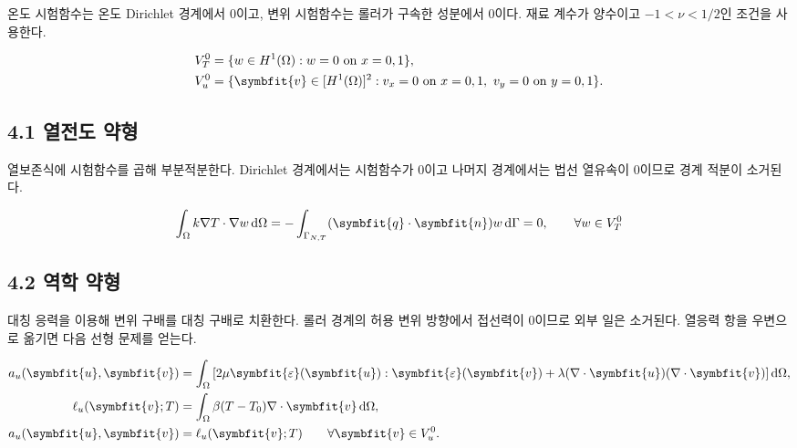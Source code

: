 \documentclass[10pt,a4paper]{article}
\renewcommand{\boldsymbol}[1]{\symbfit{#1}}
\begin{document}
온도 시험함수는 온도 Dirichlet 경계에서 0이고, 변위 시험함수는 롤러가 구속한 성분에서 0이다. 재료 계수가 양수이고 $-1<\nu<1/2$인 조건을 사용한다.\par

\begin{equation}\begin{aligned}V_T^0&=\{w\in H^1(\Omega):w=0\text{ on }x=0,1\},\\V_u^0&=\{\boldsymbol v\in[H^1(\Omega)]^2:v_x=0\text{ on }x=0,1,\ v_y=0\text{ on }y=0,1\}.\end{aligned}\end{equation}

\subsection{4.1 열전도 약형}

열보존식에 시험함수를 곱해 부분적분한다. Dirichlet 경계에서는 시험함수가 0이고 나머지 경계에서는 법선 열유속이 0이므로 경계 적분이 소거된다.\par

\begin{equation}\int_\Omega k\nabla T\cdot\nabla w\,\mathrm d\Omega=-\int_{\Gamma_{N,T}}(\boldsymbol q\cdot\boldsymbol n)w\,\mathrm d\Gamma=0,\qquad \forall w\in V_T^0\end{equation}

\subsection{4.2 역학 약형}

대칭 응력을 이용해 변위 구배를 대칭 구배로 치환한다. 롤러 경계의 허용 변위 방향에서 접선력이 0이므로 외부 일은 소거된다. 열응력 항을 우변으로 옮기면 다음 선형 문제를 얻는다.\par

\begin{equation}\begin{aligned}a_u(\boldsymbol u,\boldsymbol v)&=\int_\Omega\left[2\mu\boldsymbol\varepsilon(\boldsymbol u):\boldsymbol\varepsilon(\boldsymbol v)+\lambda(\nabla\cdot\boldsymbol u)(\nabla\cdot\boldsymbol v)\right]\mathrm d\Omega,\\\ell_u(\boldsymbol v;T)&=\int_\Omega\beta(T-T_0)\nabla\cdot\boldsymbol v\,\mathrm d\Omega,\\a_u(\boldsymbol u,\boldsymbol v)&=\ell_u(\boldsymbol v;T)\qquad\forall\boldsymbol v\in V_u^0.\end{aligned}\end{equation}
\end{document}
